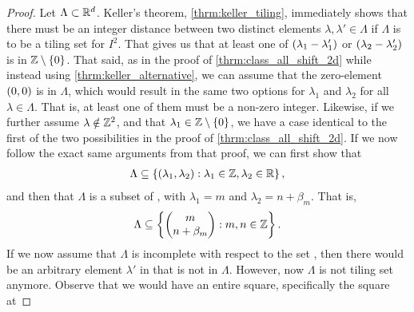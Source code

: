 \documentclass[../thesis.tex]{subfiles}
\begin{document}
\begin{proof}
    Let $\Lambda \subset \mathbb{R}^d$. Keller's theorem, \cref{thrm:keller_tiling}, immediately shows that there must be an integer distance between two distinct elements $\lambda,\lambda' \in \Lambda$ if $\Lambda$ is to be a tiling set for $I^2$. That gives us that at least one of $(\lambda_1-\lambda_1')$ or $(\lambda_2-\lambda_2')$ is in $\mathbb{Z}\setminus\{0\}$. That said, as in the proof of \cref{thrm:class_all_shift_2d} while instead using \cref{thrm:keller_alternative}, we can assume that the zero-element $(0,0)$ is in $\Lambda$, which would result in the same two options for $\lambda_1$ and $\lambda_2$ for all $\lambda\in \Lambda$. That is, at least one of them must be a non-zero integer. Likewise, if we further assume $\lambda\notin \mathbb{Z}^2$, and that $\lambda_1 \in\mathbb{Z}\setminus\{0\}$, we have a case identical to the first of the two possibilities in the proof of \cref{thrm:class_all_shift_2d}. If we now follow the exact same arguments from that proof, we can first show that 
    \begin{align*}  %
        \Lambda \subseteq \braqMed{ \bracMed{\lambda_1, \lambda_2} : \lambda_1 \in \Z, \lambda_2 \in \R},
    \end{align*}
    and then that $\Lambda$ is a subset of , with $\lambda_1 = m$ and $\lambda_2 = n+\beta_m$. That is,
    \begin{equation*}  %
        \Lambda \subseteq \braqMed{\begin{pmatrix} m \\ n+\beta_m\end{pmatrix} : m,n \in \Z}.
    \end{equation*}
    If we now assume that $\Lambda$ is incomplete with respect to the set , then there would be an arbitrary element $\lambda'$ in  that is not in $\Lambda$. However, now $\Lambda$ is not tiling set anymore. Observe that we would have an entire square, specifically the square at

\end{proof}
\end{document}
